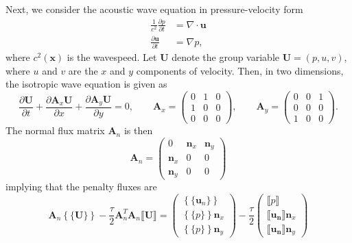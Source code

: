 \documentclass[preprint,10pt]{elsarticle}
\newcommand{\pd}[2]{\frac{\partial#1}{\partial#2}}
\newcommand{\LRc}[1]{\left\{ #1 \right\}}
\newcommand{\Grad} {\ensuremath{\nabla}}
\newcommand{\Div} {\ensuremath{\nabla\cdot}}
\newcommand{\jump}[1] {\ensuremath{\llbracket#1\rrbracket}}
\newcommand{\avg}[1] {\ensuremath{\LRc{\!\{#1\}\!}}}
\begin{document}
Next, we consider the acoustic wave equation in pressure-velocity form
\begin{align*}
\frac{1}{c^2}\pd{p}{t} &= \Div \bm{u}\\
\pd{\bm{u}}{t} &= \Grad p,
\end{align*}
where $c^2(\bm{x})$ is the wavespeed.  Let $\bm{U}$ denote the group variable $\bm{U} = (p,u,v)$, where $u$ and $v$ are the $x$ and $y$ components of velocity.  Then, in two dimensions, the isotropic wave equation is given as
\[
\pd{\bm{U}}{t} + \pd{\bm{A}_x\bm{U}}{x} + \pd{\bm{A}_y\bm{U}}{y} = 0, \qquad \bm{A}_x = 
\left(\begin{array}{ccc}
0 & 1 & 0\\
1 & 0 & 0\\
0 & 0 & 0
\end{array}
\right), \qquad 
\bm{A}_y = 
\left(\begin{array}{ccc}
0 & 0 & 1\\
0 & 0 & 0\\
1 & 0 & 0
\end{array}
\right).
\]
The normal flux matrix $\bm{A}_n$ is then
\[
\bm{A}_n = 
\left(\begin{array}{ccc}
0 & \bm{n}_x & \bm{n}_y\\
\bm{n}_x & 0 & 0\\
\bm{n}_y & 0 & 0
\end{array}
\right)
\]
implying that the penalty fluxes are 
\[
\bm{A}_n \avg{\bm{U}} - \frac{\tau}{2}\bm{A}_n^T\bm{A}_n \jump{\bm{U}} = \left(\begin{array}{c}
\avg{\bm{u}_n}\\
\avg{p }\bm{n}_x\\
\avg{p }\bm{n}_y
\end{array}
\right) - 
\frac{\tau}{2}\left(\begin{array}{c}
\jump{p}\\
\jump{\bm{u_n}}\bm{n}_x\\
\jump{\bm{u_n}}\bm{n}_y
\end{array}
\right)
\]
\end{document}
